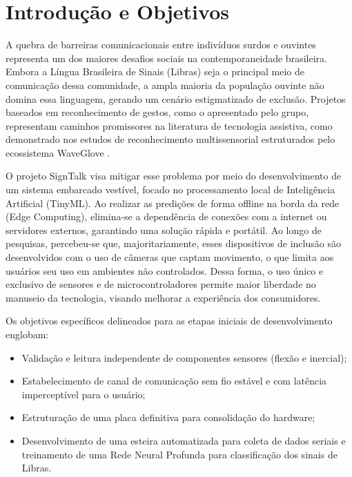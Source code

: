 \documentclass[12pt,a4paper]{article}
\begin{document}
\newpage
\tableofcontents
\newpage

\section{Introdução e Objetivos}

A quebra de barreiras comunicacionais entre indivíduos surdos e ouvintes representa um dos maiores desafios sociais na contemporaneidade brasileira. Embora a Língua Brasileira de Sinais (Libras) seja o principal meio de comunicação dessa comunidade, a ampla maioria da população ouvinte não domina essa linguagem, gerando um cenário estigmatizado de exclusão. Projetos baseados em reconhecimento de gestos, como o apresentado pelo grupo, representam caminhos promissores na literatura de tecnologia assistiva, como demonstrado nos estudos de reconhecimento multissensorial estruturados pelo ecossistema WaveGlove \cite{waveglove}.

O projeto SignTalk visa mitigar esse problema por meio do desenvolvimento de um sistema embarcado vestível, focado no processamento local de Inteligência Artificial (TinyML). Ao realizar as predições de forma offline na borda da rede (Edge Computing), elimina-se a dependência de conexões com a internet ou servidores externos, garantindo uma solução rápida e portátil. Ao longo de pesquisas, percebeu-se que, majoritariamente, esses dispositivos de inclusão são desenvolvidos com o uso de câmeras que captam movimento, o que limita aos usuários seu uso em ambientes não controlados. Dessa forma, o uso único e exclusivo de sensores e de microcontroladores permite maior liberdade no manuseio da tecnologia, visando melhorar a experiência dos consumidores.

Os objetivos específicos delineados para as etapas iniciais de desenvolvimento englobam:
\begin{itemize}
    \item Validação e leitura independente de componentes sensores (flexão e inercial);
    \item Estabelecimento de canal de comunicação sem fio estável e com latência imperceptível para o usuário;
    \item Estruturação de uma placa definitiva para consolidação do hardware;
    \item Desenvolvimento de uma esteira automatizada para coleta de dados seriais e treinamento de uma Rede Neural Profunda para classificação dos sinais de Libras.
\end{itemize}
\end{document}
